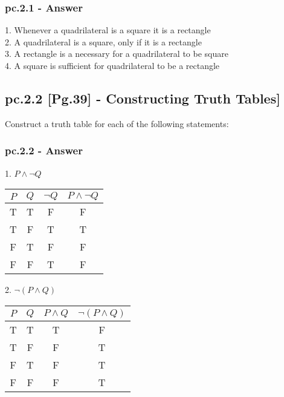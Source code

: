 \subsubsection*{pc.2.1 - Answer}

1. Whenever a quadrilateral is a square it is a rectangle \\
2. A quadrilateral is a square, only if it is a rectangle \\
3. A rectangle is a necessary for a quadrilateral to be square \\
4. A square is sufficient for quadrilateral to be a rectangle \\


\subsection{pc.2.2 [Pg.39] - Constructing Truth Tables]}

Construct a truth table for each of the following statements: \\

\subsubsection*{pc.2.2 - Answer}
1. $P \wedge \neg Q$  \\

\begin{center}
\begin{tabular}{|c|c|c|c|}
\hline 
$P$ & $Q$ & $\neg Q$ & $P \wedge \neg Q$ \\ 
\hline 
T & T & F & F \\ 
\hline 
T & F & T & T \\ 
\hline 
F & T & F & F \\ 
\hline 
F & F & T & F \\ 
\hline 
\end{tabular} 
\end{center}

2. $\neg (P \wedge Q)$ \\

\begin{center}
\begin{tabular}{|c|c|c|c|}
\hline 
$P$ & $Q$ & $P 	\wedge Q$ & $\neg (P \wedge Q)$ \\ 
\hline 
T & T & T & F \\ 
\hline 
T & F & F & T \\ 
\hline 
F & T & F & T \\ 
\hline 
F & F & F & T \\ 
\hline 
\end{tabular} 
\end{center}

